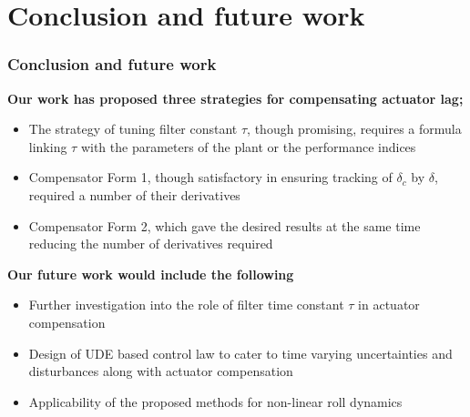 \documentclass[table,10pt,red]{beamer}	%
\begin{document}
\section{Conclusion and future work}
\begin{frame}
\frametitle{Conclusion and future work}
\textbf{Our work has proposed three strategies for compensating actuator lag;}
\begin{itemize}  %
		\item The strategy of tuning filter constant $\tau$, though promising, requires a formula linking $\tau$ with the parameters of the plant or the performance indices
		\item Compensator Form 1, though satisfactory in ensuring tracking of $\delta_c$ by $\delta$, required a number of their derivatives
		\item Compensator Form 2, which gave the desired results at the same time reducing the number of derivatives required	%
\end{itemize}
\textbf{Our future work would include the following}
\begin{itemize}  %
		\item Further investigation into the role of filter time constant $\tau$ in actuator compensation
		\item Design of UDE based control law to cater to time varying uncertainties and disturbances along with actuator compensation
		\item Applicability of the proposed methods for non-linear roll dynamics
\end{itemize}


\end{frame}
\end{document}
